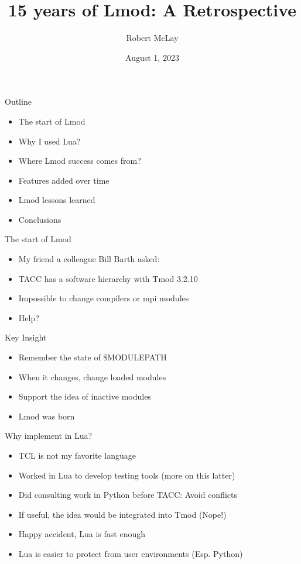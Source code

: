 \documentclass{beamer}
\begin{document}
\title[Lmod]{15 years of Lmod: A Retrospective}
\author{Robert McLay} 
\date{August 1, 2023}

\frame{\titlepage} 


\begin{frame}{Outline}
  \begin{itemize}
    \item The start of Lmod
    \item Why I used Lua?
    \item Where Lmod success comes from?
    \item Features added over time
    \item Lmod lessons learned
    \item Conclusions
  \end{itemize}
\end{frame}

\begin{frame}{The start of Lmod}
  \begin{itemize}
    \item My friend a colleague Bill Barth asked:
    \item TACC has a software hierarchy with Tmod 3.2.10
    \item Impossible to change compilers or mpi modules
    \item Help?
  \end{itemize}
\end{frame}

\begin{frame}{Key Insight}
  \begin{itemize}
    \item Remember the state of \$MODULEPATH
    \item When it changes, change loaded modules
    \item Support the idea of inactive modules
    \item Lmod was born
  \end{itemize}
\end{frame}

\begin{frame}{Why implement in Lua?}
  \begin{itemize}
    \item TCL is not my favorite language
    \item Worked in Lua to develop testing tools (more on this latter)
    \item Did consulting work in Python before TACC: Avoid conflicts
    \item If useful, the idea would be integrated into Tmod (Nope!)
    \item Happy accident, Lua is fast enough
    \item Lua is easier to protect from user environments (Esp. Python)
  \end{itemize}
\end{frame}
\end{document}
